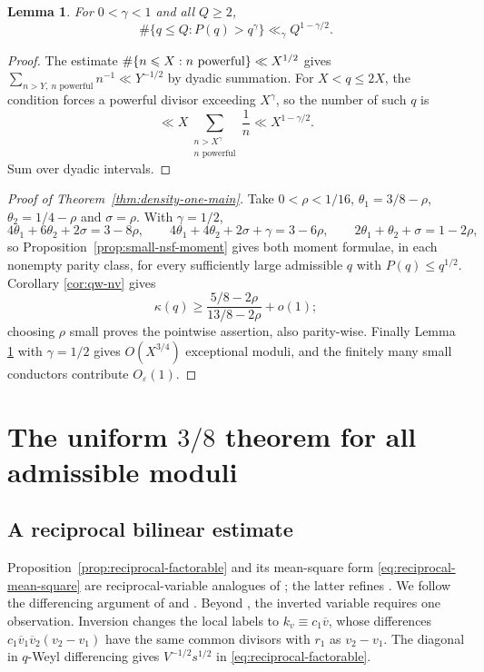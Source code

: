 \documentclass[12pt, a4paper]{amsart}
\numberwithin{equation}{section}
\newcommand{\ep}{\varepsilon}
\renewcommand{\bar}[1]{\overline{#1}}
\renewcommand{\le}{\leqslant}
\renewcommand{\ge}{\geqslant}
\theoremstyle{plain}
\newtheorem{lem}{Lemma}[section]
\begin{document}
\begin{lem}\label{lem:large-nsf-part-density}
For $0<\gamma<1$ and all $Q\ge2$,
$$
\#\{q\le Q:P(q)>q^\gamma\}\ll_\gamma Q^{1-\gamma/2}.
$$
\end{lem}

\begin{proof}
The estimate $\#\{n\le X:n\hbox{ powerful}\}\ll X^{1/2}$ gives $\sum_{n>Y,\ n\textrm{ powerful}}n^{-1}\ll Y^{-1/2}$ by dyadic summation. For $X<q\le2X$, the condition forces a powerful divisor exceeding $X^\gamma$, so the number of such $q$ is
$$
\ll X\sum_{\substack{n>X^\gamma\\ n\textrm{ powerful}}}\frac1n\ll X^{1-\gamma/2}.
$$
 Sum over dyadic intervals.
\end{proof}

\begin{proof}[Proof of Theorem~\ref{thm:density-one-main}]
Take $0<\rho<1/16$, $\theta_1=3/8-\rho$, $\theta_2=1/4-\rho$ and $\sigma=\rho$. With $\gamma=1/2$,
$$
4\theta_1+6\theta_2+2\sigma=3-8\rho,\qquad
4\theta_1+4\theta_2+2\sigma+\gamma=3-6\rho,\qquad
2\theta_1+\theta_2+\sigma=1-2\rho,
$$
so Proposition~\ref{prop:small-nsf-moment} gives both moment formulae, in each nonempty parity class, for every sufficiently large admissible $q$ with $P(q)\le q^{1/2}$. Corollary \ref{cor:qw-nv} gives
$$
\kappa(q)\ge\frac{5/8-2\rho}{13/8-2\rho}+o(1);
$$
choosing $\rho$ small proves the pointwise assertion, also parity-wise. Finally Lemma \ref{lem:large-nsf-part-density} with $\gamma=1/2$ gives $O(X^{3/4})$ exceptional moduli, and the finitely many small conductors contribute $O_\ep(1)$.
\end{proof}

\section{The uniform $3/8$ theorem for all admissible moduli}
\label{sec:allq-three-eighths}

\subsection{A reciprocal bilinear estimate}
Proposition~\ref{prop:reciprocal-factorable} and its mean-square form \eqref{eq:reciprocal-mean-square} are reciprocal-variable analogues of \cite[Theorems~2.1 and~3.1]{MQW}; the latter refines \cite[Theorem~5]{BM2015}. We follow the differencing argument of \cite[Section~9]{BM2015} and \cite[Section~3.2]{MQW}. Beyond \cite[Section~3.2]{MQW}, the inverted variable requires one observation. Inversion changes the local labels to $k_v\equiv c_1\bar v$, whose differences $c_1\bar v_1\bar v_2(v_2-v_1)$ have the same common divisors with $r_1$ as $v_2-v_1$. The diagonal in $q$-Weyl differencing gives $V^{-1/2}s^{1/2}$ in \eqref{eq:reciprocal-factorable}.
\end{document}
